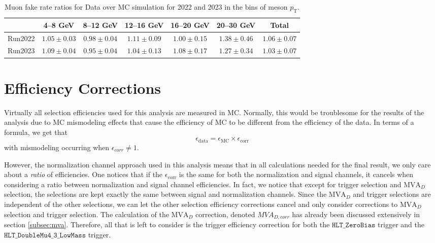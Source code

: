 
\begin{table}[htbp]
    \centering
    \begin{tabular}{|c|c|c|c|c|c|c|}
    \hline
     & \textbf{4--8 GeV} & \textbf{8--12 GeV} & \textbf{12--16 GeV} & \textbf{16--20 GeV} & \textbf{20--30 GeV} & \textbf{Total} \\
    \hline
    Run2022 & $1.05 \pm 0.03$ & $0.98 \pm 0.04$ & $1.11 \pm 0.09$ & $1.00 \pm 0.15$ & $1.38 \pm 0.46$ & $1.06 \pm 0.07$ \\
    Run2023 & $1.09 \pm 0.04$ & $0.95 \pm 0.04$ & $1.04 \pm 0.13$ & $1.08 \pm 0.17$ & $1.27 \pm 0.34$ & $1.03 \pm 0.07$ \\
    \hline
    \end{tabular}
    \caption{Muon fake rate ratios for Data over MC simulation for 2022 and 2023 in the bins of meson $p_\mathrm{T}$.}
    \label{tab:muon_fake_rate}
\end{table}


\section{Efficiency Corrections}
\label{sec:efficiency_corrections}


Virtually all selection efficiencies used for this analysis are measured in MC. Normally, this would be troublesome for the results of the analysis due to MC mismodeling effects that cause the efficiency of MC to be different from the efficiency of the data. In terms of a formula, we get that 
\begin{equation}
    \epsilon_{\text{data}} = \epsilon_{\text{MC}} \times \epsilon_{\text{corr}}
\end{equation}
with mismodeling occurring when $\epsilon_{corr} \neq 1$. 

However, the normalization channel approach used in this analysis means that in all calculations needed for the final result, we only care about a \textit{ratio} of efficiencies. One notices that if the $\epsilon_{\text{corr}}$ is the same for both the normalization and signal channels, it cancels when considering a ratio between normalization and signal channel efficiencies. In fact, we notice that except for trigger selection and $\text{MVA}_D$ selection, the selections are kept exactly the same between signal and normalization channels. Since the $\text{MVA}_D$ and trigger selections are independent of the other selections, we can let the other selection efficiency corrections cancel and only consider corrections to $\text{MVA}_D$ selection and trigger selection. The calculation of the $\text{MVA}_D$ correction, denoted ${MVA}_{D,corr}$ has already been discussed extensively in section \ref{subsec:mva}. Therefore, all that is left to consider is the trigger efficiency correction for both the $\texttt{HLT\_ZeroBias}$ trigger and the $\texttt{HLT\_DoubleMu4\_3\_LowMass}$ trigger. 

